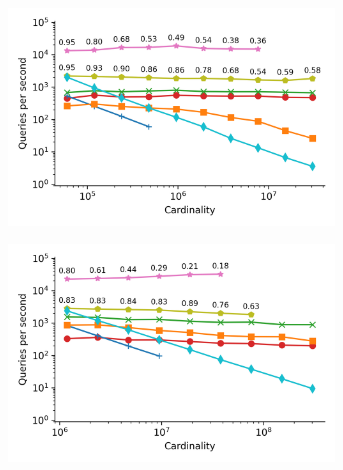 \begin{figure}
    \captionsetup[subfigure]{aboveskip=-5pt,belowskip=-0.5pt}
    \begin{subfigure}[b]{0.5\textwidth}
        \includegraphics[width=0.95\textwidth]{plots/fashion-mnist_PermutedBall_10_throughput.png}
        \label{fig:results:fashion-mnist-scaling}
    \end{subfigure}%
    \begin{subfigure}[b]{0.5\textwidth}
        \includegraphics[width=0.95\textwidth]{plots/glove-25_PermutedBall_10_throughput.png}
        \label{fig:results:glove-25-scaling}
    \end{subfigure}%
    \\
    \begin{subfigure}[b]{0.5\textwidth}

\end{subfigure}
\end{figure}
